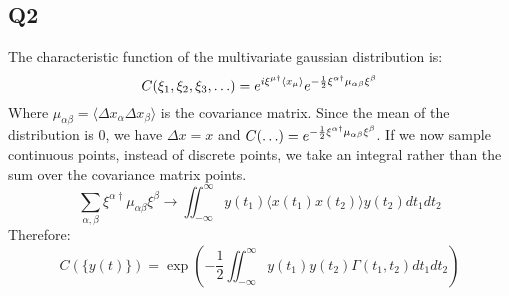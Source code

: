 \documentclass[../main.tex]{subfiles}
\begin{document}
\subsection{Q2}
The characteristic function of the multivariate gaussian distribution is:
\begin{equation}
	C(\xi_1, \xi_2, \xi_3, \mathellipsis) = e^{i\mathbf{\xi^{\mu\dag}}\langle x_\mu\rangle}e^{-\frac{1}{2}\xi^{\alpha\dag}\mu_{\alpha\beta}\xi^{\beta}}
\end{equation}
Where $\mu_{\alpha\beta}=\langle \Delta x_\alpha\Delta x_\beta \rangle$ is the covariance matrix. Since the mean of the distribution is $0$, we have $\Delta x = x$ and $C(\mathellipsis)=e^{-\frac{1}{2}\xi^{\alpha\dag}\mu_{\alpha\beta}\xi^{\beta}}$. If we now sample continuous points, instead of discrete points, we take an integral rather than the sum over the covariance matrix points.
\begin{equation}
	\sum_{\alpha,\beta}\xi^{\alpha \dag}\mu_{\alpha\beta}\xi^{\beta} \rightarrow \iint_{-\infty}^{\infty} y(t_1)\langle x(t_1)x(t_2)\rangle y(t_2) dt_1 dt_2
\end{equation}
Therefore:
\begin{equation}
	C(\{y(t)\}) = \exp{\left(-\frac{1}{2}\iint_{-\infty}^{\infty}y(t_1)y(t_2)\Gamma(t_1, t_2)dt_1dt_2\right)}
\end{equation}
\end{document}
